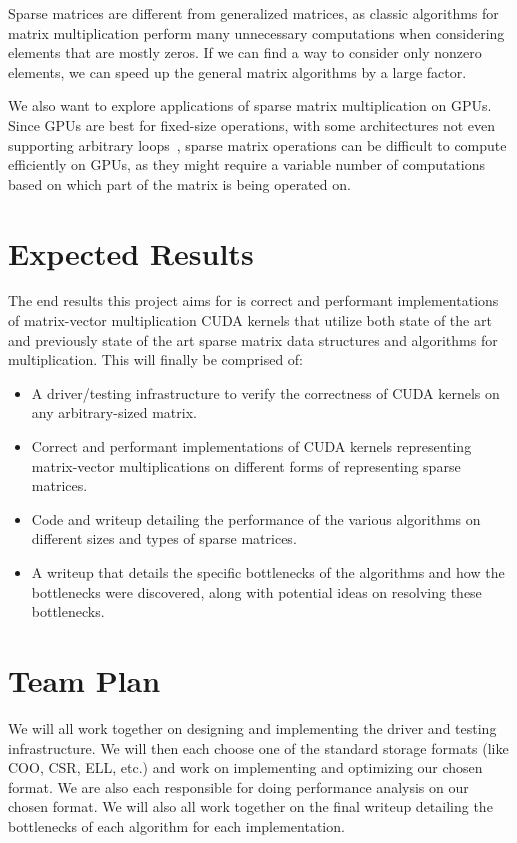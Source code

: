 \documentclass[11pt]{article}
\begin{document}
Sparse matrices are different from generalized matrices, as classic algorithms for matrix multiplication perform many unnecessary computations when considering elements that are mostly zeros.
If we can find a way to consider only nonzero elements, we can speed up the general matrix algorithms by a large factor.

We also want to explore applications of sparse matrix multiplication on GPUs.
Since GPUs are best for fixed-size operations, with some architectures not even supporting arbitrary loops~\cite{redhat}, sparse matrix operations can be difficult to compute efficiently on GPUs, as they might require a variable number of computations based on which part of the matrix is being operated on.

\section{Expected Results}

The end results this project aims for is correct and performant implementations of matrix-vector multiplication CUDA kernels that utilize both state of the art and previously state of the art sparse matrix data structures and algorithms for multiplication. This will finally be comprised of:

\begin{itemize}
    \item A driver/testing infrastructure to verify the correctness of CUDA kernels on any arbitrary-sized matrix.
    \item Correct and performant implementations of CUDA kernels representing matrix-vector multiplications on different forms of representing sparse matrices.
    \item Code and writeup detailing the performance of the various algorithms on different sizes and types of sparse matrices.
    \item A writeup that details the specific bottlenecks of the algorithms and how the bottlenecks were discovered, along with potential ideas on resolving these bottlenecks.
\end{itemize}


\section*{Team Plan}


We will all work together on designing and implementing the driver and testing infrastructure.
We will then each choose one of the standard storage formats (like COO, CSR, ELL, etc.) and work on implementing and optimizing our chosen format.
We are also each responsible for doing performance analysis on our chosen format.
We will also all work together on the final writeup detailing the bottlenecks of each algorithm for each implementation.



\end{document}
